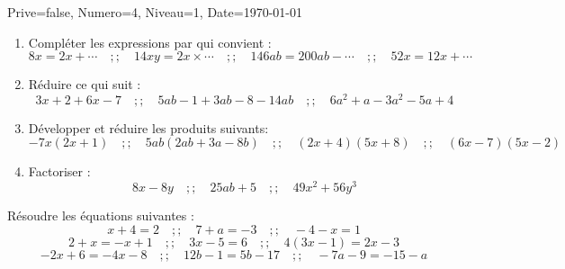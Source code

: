 \documentclass[a4paper,12pt]{article}
\begin{document}
\begin{Maquette}[DM]{Prive=false, Numero=4, Niveau=1, Date=\today}

\begin{exercice}
\begin{enumerate}
\item Compléter les expressions par qui convient :
$$
 8x = 2x + \cdots\quad ;; \quad
 14xy = 2x \times \cdots\quad ;; \quad
 146 ab = 200 ab - \cdots\quad ;; \quad
 52 x = 12 x + \cdots
$$
\item Réduire ce qui suit :
$$
3x+2+6x-7\quad ;; \quad
5ab-1+3ab-8-14ab\quad ;; \quad
6a^{2}+a-3a^{2}-5a+4
$$
\item Développer et réduire les produits suivants:
$$
-7x(2x+1)\quad ;; \quad
5ab(2ab+3a-8b)\quad ;; \quad
(2x+4)(5x+8)\quad ;; \quad
(6x-7)(5x-2)
$$
\item Factoriser :
$$
8x-8y\quad ;; \quad
25ab+5\quad ;; \quad
49x^{2}+56y^{3}
$$
\end{enumerate}
\end{exercice}

\begin{exercice}
Résoudre les équations suivantes :
$$
x+4=2\quad ;; \quad
7+a=-3\quad ;; \quad
-4-x=1
$$
$$
2+x=-x+1\quad ;; \quad
3x-5=6\quad ;; \quad
4(3x-1)=2x-3
$$
$$
-2x+6=-4x-8\quad ;; \quad
12b-1=5b-17\quad ;; \quad
-7a-9=-15-a
$$
\end{exercice}
\begin{exercice}
\end{exercice}
\end{Maquette}
\end{document}
